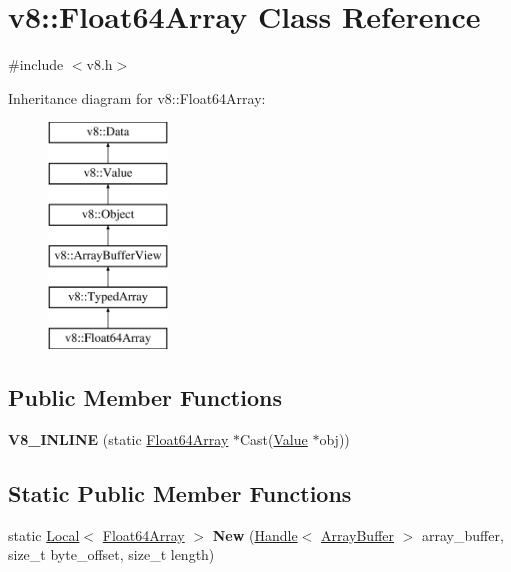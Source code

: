 \hypertarget{classv8_1_1_float64_array}{}\section{v8\+:\+:Float64\+Array Class Reference}
\label{classv8_1_1_float64_array}


{\ttfamily \#include $<$v8.\+h$>$}

Inheritance diagram for v8\+:\+:Float64\+Array\+:\begin{figure}[H]
\begin{center}
\leavevmode
\includegraphics[height=6.000000cm]{classv8_1_1_float64_array}
\end{center}
\end{figure}
\subsection*{Public Member Functions}
\begin{DoxyCompactItemize}
\item 
\hypertarget{classv8_1_1_float64_array_ab7d7abc2a709e38dfab557c26c64880a}{}{\bfseries V8\+\_\+\+I\+N\+L\+I\+N\+E} (static \hyperlink{classv8_1_1_float64_array}{Float64\+Array} $\ast$Cast(\hyperlink{classv8_1_1_value}{Value} $\ast$obj))\label{classv8_1_1_float64_array_ab7d7abc2a709e38dfab557c26c64880a}

\end{DoxyCompactItemize}
\subsection*{Static Public Member Functions}
\begin{DoxyCompactItemize}
\item 
\hypertarget{classv8_1_1_float64_array_ae09a38a945fb88065956e1d87132f0b4}{}static \hyperlink{classv8_1_1_local}{Local}$<$ \hyperlink{classv8_1_1_float64_array}{Float64\+Array} $>$ {\bfseries New} (\hyperlink{classv8_1_1_handle}{Handle}$<$ \hyperlink{classv8_1_1_array_buffer}{Array\+Buffer} $>$ array\+\_\+buffer, size\+\_\+t byte\+\_\+offset, size\+\_\+t length)\label{classv8_1_1_float64_array_ae09a38a945fb88065956e1d87132f0b4}

\end{DoxyCompactItemize}
